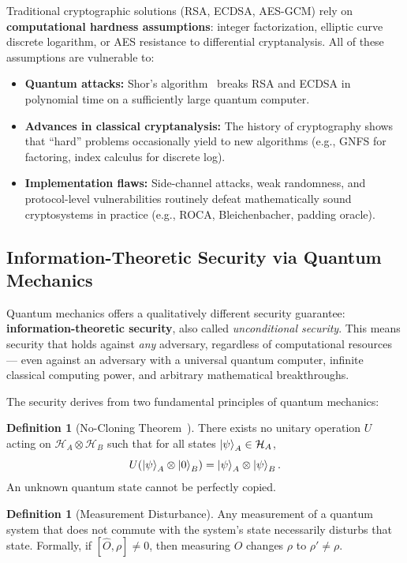 \documentclass[11pt,a4paper]{article}
\theoremstyle{plain}
\theoremstyle{definition}
\newtheorem{definition}[theorem]{Definition}
\theoremstyle{remark}
\newcommand{\cH}{\mathcal{H}}
\begin{document}
Traditional cryptographic solutions (RSA, ECDSA, AES-GCM) rely on
\textbf{computational hardness assumptions}: integer factorization, elliptic
curve discrete logarithm, or AES resistance to differential cryptanalysis.
All of these assumptions are vulnerable to:

\begin{itemize}
  \item \textbf{Quantum attacks:} Shor's algorithm~\cite{shor1994} breaks RSA
        and ECDSA in polynomial time on a sufficiently large quantum computer.
  \item \textbf{Advances in classical cryptanalysis:} The history of
        cryptography shows that ``hard'' problems occasionally yield to new
        algorithms (e.g., GNFS for factoring, index calculus for discrete log).
  \item \textbf{Implementation flaws:} Side-channel attacks, weak randomness,
        and protocol-level vulnerabilities routinely defeat mathematically
        sound cryptosystems in practice (e.g., ROCA, Bleichenbacher, padding oracle).
\end{itemize}

\subsection{Information-Theoretic Security via Quantum Mechanics}
\label{sec:intro_quantum}

Quantum mechanics offers a qualitatively different security guarantee:
\textbf{information-theoretic security}, also called \emph{unconditional security}.
This means security that holds against \emph{any} adversary, regardless of
computational resources — even against an adversary with a universal quantum
computer, infinite classical computing power, and arbitrary mathematical
breakthroughs.

The security derives from two fundamental principles of quantum mechanics:

\begin{definition}[No-Cloning Theorem~\cite{wootters1982}]
\label{def:noclone}
There exists no unitary operation $U$ acting on $\cH_A \otimes \cH_B$ such that
for all states $\ket{\psi}_A \in \cH_A$,
\[
U(\ket{\psi}_A \otimes \ket{0}_B) = \ket{\psi}_A \otimes \ket{\psi}_B.
\]
An unknown quantum state cannot be perfectly copied.
\end{definition}

\begin{definition}[Measurement Disturbance]
\label{def:disturb}
Any measurement of a quantum system that does not commute with the system's
state necessarily disturbs that state. Formally, if $[\hat{O}, \rho] \neq 0$,
then measuring $\hat{O}$ changes $\rho$ to $\rho' \neq \rho$.
\end{definition}
\end{document}
